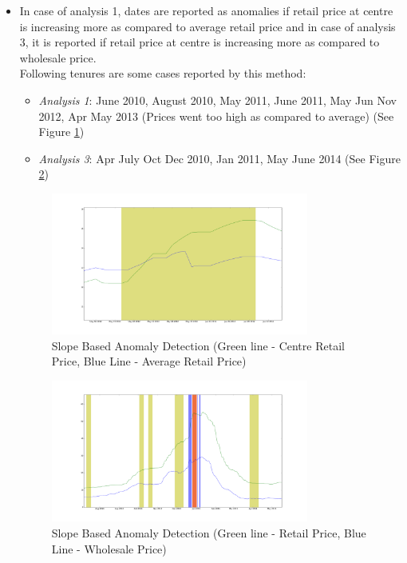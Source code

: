 			
		\begin{itemize}
		
			\item In case of analysis 1, dates are reported as anomalies if retail price at centre is increasing more as compared to average retail price and in case of analysis 3, it is reported if retail price at centre is increasing more as compared to wholesale price. \\
			Following tenures are some cases reported by this method:
			\begin{itemize}
				\item \textit{Analysis 1}: June 2010, August 2010, May 2011, June 2011, May Jun Nov 2012, Apr May 2013 (Prices went too high as compared to average) (See Figure \ref{fig:12111})
				\item \textit{Analysis 3}: Apr July Oct Dec 2010, Jan 2011, May June 2014 (See Figure \ref{fig:12131})
			\end{itemize}
			\begin{figure}[H]
		    	\centering
  		    	\includegraphics[width=0.8\textwidth]{graphs/12111.png}
		    	\caption{Slope Based Anomaly Detection (Green line - Centre Retail Price, Blue Line - Average Retail Price)}
		    	\label{fig:12111}
			\end{figure}
			
			\begin{figure}[H]
		    	\centering
  		    	\includegraphics[width=0.8\textwidth]{graphs/12131.png}
		    	\caption{Slope Based Anomaly Detection (Green line - Retail Price, Blue Line - Wholesale Price)}
		    	\label{fig:12131}
			\end{figure}
			

\end{itemize}
